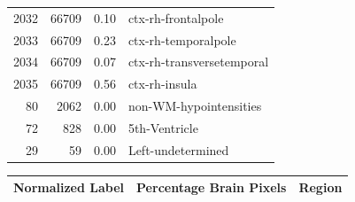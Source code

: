 \documentclass[pdflatex,sn-nature]{sn-jnl}%
\theoremstyle{thmstyleone}%
\theoremstyle{thmstyletwo}%
\theoremstyle{thmstylethree}%
\begin{document}
\begin{appendices}
\begin{small}
\begin{longtable}{r|r|r|l}
   2032 &     66709 &                0.10 &              ctx-rh-frontalpole \\
   2033 &     66709 &                0.23 &             ctx-rh-temporalpole \\
   2034 &     66709 &                0.07 &       ctx-rh-transversetemporal \\
   2035 &     66709 &                0.56 &                   ctx-rh-insula \\
     80 &      2062 &                0.00 &          non-WM-hypointensities \\
     72 &       828 &                0.00 &                   5th-Ventricle \\
     29 &        59 &                0.00 &               Left-undetermined \\
\end{longtable}
\end{small}


\begin{small}
\begin{longtable}{l|r|l}

\toprule
            \textbf{Normalized Label} &  \textbf{Percentage Brain Pixels} &                    \textbf{Region} \\
\midrule
\endfirsthead


\end{longtable}
\end{small}
\end{appendices}
\end{document}
